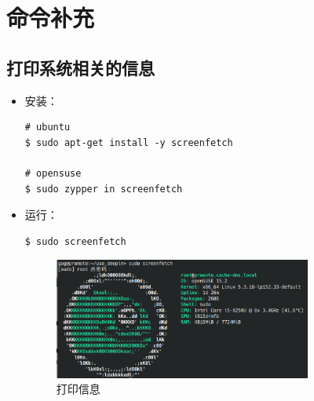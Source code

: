 
\chapter{命令补充}


\section{打印系统相关的信息}
\begin{itemize}
\item 安装：
\begin{lstlisting}
# ubuntu 
$ sudo apt-get install -y screenfetch 

# opensuse 
$ sudo zypper in screenfetch
\end{lstlisting}

\item 运行：
\begin{lstlisting}
$ sudo screenfetch
\end{lstlisting}

\begin{figure}[htp]  
    \centering
    \includegraphics[width=0.8\textwidth]{./img/screenfetch.png} %
    \caption{打印信息} %
    \label{screenfetch} %
\end{figure}
\end{itemize}

